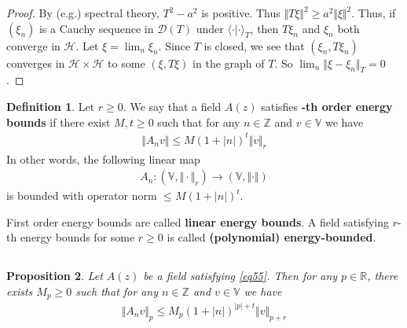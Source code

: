 \documentclass[12pt,b5paper,notitlepage]{article}
\theoremstyle{definition}
\newtheorem{df}{Definition}[section]
\theoremstyle{plain}
\newtheorem{pp}[df]{Proposition}
\newcommand{\mc}{\mathcal}
\newcommand{\Dom}{\scr{D}}
\newcommand{\bk}[1]{\langle {#1}\rangle}
\newcommand{\scr}{\mathscr}
\newcommand{\Vbb}{\mathbb V}
\newcommand{\Zbb}{\mathbb Z}
\newcommand{\Rbb}{\mathbb R}
\numberwithin{equation}{section}
\begin{document}
\begin{proof}
By (e.g.) spectral theory, $T^2-a^2$ is positive. Thus $\Vert T\xi\Vert^2\geq a^2\Vert\xi\Vert^2$. Thus, if $(\xi_n)$ is a Cauchy sequence in $\Dom(T)$ under $\bk{\cdot|\cdot}_T$, then $T\xi_n$ and $\xi_n$ both converge in $\mc H$. Let $\xi=\lim_n\xi_n$. Since $T$ is closed, we see that $(\xi_n,T\xi_n)$ converges in $\mc H\times\mc H$ to some $(\xi,T\xi)$ in the graph of $T$. So $\lim_n\Vert \xi-\xi_n\Vert_T=0$.
\end{proof}



\begin{df}
Let $r\geq0$. We say that a field $A(z)$ satisfies \textbf{-th order energy bounds}  if there exist $M,t\geq0$ such that for any $n\in\Zbb$ and $v\in\Vbb$ we have
\begin{align}\label{eq55}
\Vert A_nv\Vert\leq M(1+|n|)^t \Vert v\Vert_r
\end{align}
In other words, the following linear map
\begin{align*}
A_n:(\Vbb,\Vert\cdot\Vert_r)\rightarrow (\Vbb,\Vert\cdot\Vert)
\end{align*}
is bounded with operator norm $\leq M(1+|n|)^t$.

First order energy bounds are called \textbf{linear energy bounds}.  A field satisfying $r$-th energy bounds for some $r\geq 0$ is called \textbf{(polynomial) energy-bounded}. \hfill\qedsymbol
\end{df}



\subsection{}


\begin{pp}\label{lb35}
Let $A(z)$ be a field satisfying \eqref{eq55}. Then for any $p\in\Rbb$, there exists $M_p\geq0$ such that for any $n\in\Zbb$ and $v\in\Vbb$ we have
\begin{align*}
\Vert A_nv\Vert_p\leq M_p(1+|n|)^{|p|+t}\Vert v\Vert_{p+r}
\end{align*} 
\end{pp}
\end{document}
